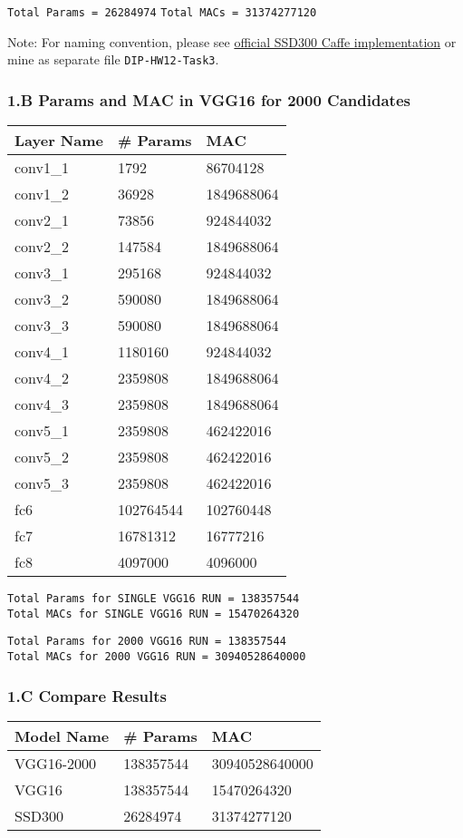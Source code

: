 \documentclass[11pt]{article}
\begin{document}
\texttt{Total\ Params\ =\ 26284974} \texttt{Total\ MACs\ =\ 31374277120}

Note: For naming convention, please see
\href{https://github.com/weiliu89/caffe/tree/ssd}{official SSD300 Caffe
implementation} or mine as separate file \texttt{DIP-HW12-Task3}.

    \hypertarget{b-params-and-mac-in-vgg16-for-2000-candidates}{%
\subsubsection{1.B Params and MAC in VGG16 for 2000
Candidates}\label{b-params-and-mac-in-vgg16-for-2000-candidates}}

\begin{longtable}[]{@{}lll@{}}
\toprule
Layer Name & \# Params & MAC\tabularnewline
\midrule
\endhead
conv1\_1 & 1792 & 86704128\tabularnewline
conv1\_2 & 36928 & 1849688064\tabularnewline
conv2\_1 & 73856 & 924844032\tabularnewline
conv2\_2 & 147584 & 1849688064\tabularnewline
conv3\_1 & 295168 & 924844032\tabularnewline
conv3\_2 & 590080 & 1849688064\tabularnewline
conv3\_3 & 590080 & 1849688064\tabularnewline
conv4\_1 & 1180160 & 924844032\tabularnewline
conv4\_2 & 2359808 & 1849688064\tabularnewline
conv4\_3 & 2359808 & 1849688064\tabularnewline
conv5\_1 & 2359808 & 462422016\tabularnewline
conv5\_2 & 2359808 & 462422016\tabularnewline
conv5\_3 & 2359808 & 462422016\tabularnewline
fc6 & 102764544 & 102760448\tabularnewline
fc7 & 16781312 & 16777216\tabularnewline
fc8 & 4097000 & 4096000\tabularnewline
\bottomrule
\end{longtable}

\texttt{Total\ Params\ for\ SINGLE\ VGG16\ RUN\ =\ 138357544}
\texttt{Total\ MACs\ for\ SINGLE\ VGG16\ RUN\ =\ 15470264320}

\texttt{Total\ Params\ for\ 2000\ VGG16\ RUN\ =\ 138357544}
\texttt{Total\ MACs\ for\ 2000\ VGG16\ RUN\ =\ 30940528640000}

    \hypertarget{c-compare-results}{%
\subsubsection{1.C Compare Results}\label{c-compare-results}}

\begin{longtable}[]{@{}lll@{}}
\toprule
Model Name & \# Params & MAC\tabularnewline
\midrule
\endhead
VGG16-2000 & 138357544 & 30940528640000\tabularnewline
VGG16 & 138357544 & 15470264320\tabularnewline
SSD300 & 26284974 & 31374277120\tabularnewline
\bottomrule
\end{longtable}
\end{document}
